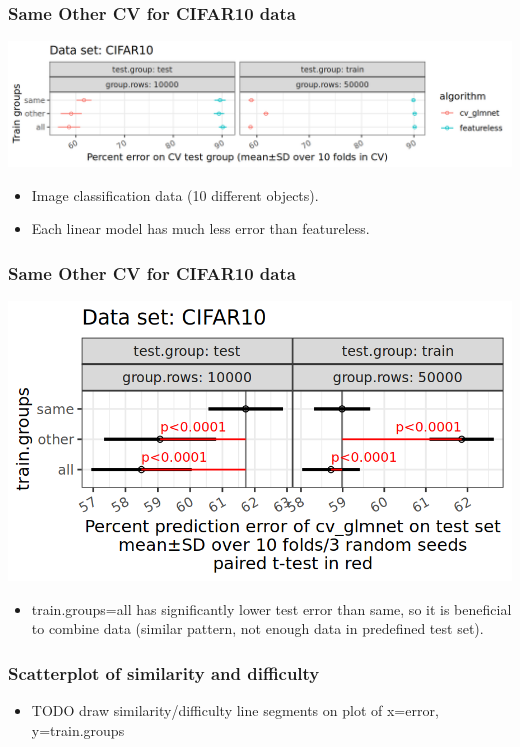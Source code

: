 \documentclass{beamer}
\begin{document}
\begin{frame}[fragile]
  \frametitle{Same Other CV for CIFAR10 data}
  \includegraphics[width=\textwidth]{CIFAR10_error_glmnet_featureless_mean_SD.png}
  \begin{itemize}
  \item Image classification data (10 different objects).
  \item Each linear model has much less error than featureless.
  \end{itemize}
\end{frame}

\begin{frame}
  \frametitle{Same Other CV for CIFAR10 data}
  \includegraphics[width=\textwidth]{CIFAR10_error_glmnet_sizes_mean_SD_pvalue.png}
  \begin{itemize}
  \item train.groups=all has significantly
    lower test error than same, so it is beneficial to combine data
    (similar pattern, not enough data in predefined test set).
  \end{itemize}
\end{frame}

\begin{frame}
  \frametitle{Scatterplot of similarity and difficulty}
  \begin{itemize}
  \item TODO draw similarity/difficulty line segments on plot of x=error, y=train.groups 
  \end{itemize}
\end{frame}
\end{document}
